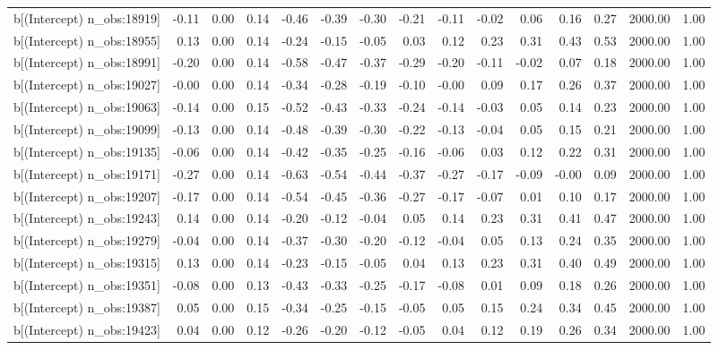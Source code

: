 \begin{table}[ht]
\begin{tabular}{rrrrrrrrrrrrrrr}
  b[(Intercept) n\_obs:18919] & -0.11 & 0.00 & 0.14 & -0.46 & -0.39 & -0.30 & -0.21 & -0.11 & -0.02 & 0.06 & 0.16 & 0.27 & 2000.00 & 1.00 \\ 
  b[(Intercept) n\_obs:18955] & 0.13 & 0.00 & 0.14 & -0.24 & -0.15 & -0.05 & 0.03 & 0.12 & 0.23 & 0.31 & 0.43 & 0.53 & 2000.00 & 1.00 \\ 
  b[(Intercept) n\_obs:18991] & -0.20 & 0.00 & 0.14 & -0.58 & -0.47 & -0.37 & -0.29 & -0.20 & -0.11 & -0.02 & 0.07 & 0.18 & 2000.00 & 1.00 \\ 
  b[(Intercept) n\_obs:19027] & -0.00 & 0.00 & 0.14 & -0.34 & -0.28 & -0.19 & -0.10 & -0.00 & 0.09 & 0.17 & 0.26 & 0.37 & 2000.00 & 1.00 \\ 
  b[(Intercept) n\_obs:19063] & -0.14 & 0.00 & 0.15 & -0.52 & -0.43 & -0.33 & -0.24 & -0.14 & -0.03 & 0.05 & 0.14 & 0.23 & 2000.00 & 1.00 \\ 
  b[(Intercept) n\_obs:19099] & -0.13 & 0.00 & 0.14 & -0.48 & -0.39 & -0.30 & -0.22 & -0.13 & -0.04 & 0.05 & 0.15 & 0.21 & 2000.00 & 1.00 \\ 
  b[(Intercept) n\_obs:19135] & -0.06 & 0.00 & 0.14 & -0.42 & -0.35 & -0.25 & -0.16 & -0.06 & 0.03 & 0.12 & 0.22 & 0.31 & 2000.00 & 1.00 \\ 
  b[(Intercept) n\_obs:19171] & -0.27 & 0.00 & 0.14 & -0.63 & -0.54 & -0.44 & -0.37 & -0.27 & -0.17 & -0.09 & -0.00 & 0.09 & 2000.00 & 1.00 \\ 
  b[(Intercept) n\_obs:19207] & -0.17 & 0.00 & 0.14 & -0.54 & -0.45 & -0.36 & -0.27 & -0.17 & -0.07 & 0.01 & 0.10 & 0.17 & 2000.00 & 1.00 \\ 
  b[(Intercept) n\_obs:19243] & 0.14 & 0.00 & 0.14 & -0.20 & -0.12 & -0.04 & 0.05 & 0.14 & 0.23 & 0.31 & 0.41 & 0.47 & 2000.00 & 1.00 \\ 
  b[(Intercept) n\_obs:19279] & -0.04 & 0.00 & 0.14 & -0.37 & -0.30 & -0.20 & -0.12 & -0.04 & 0.05 & 0.13 & 0.24 & 0.35 & 2000.00 & 1.00 \\ 
  b[(Intercept) n\_obs:19315] & 0.13 & 0.00 & 0.14 & -0.23 & -0.15 & -0.05 & 0.04 & 0.13 & 0.23 & 0.31 & 0.40 & 0.49 & 2000.00 & 1.00 \\ 
  b[(Intercept) n\_obs:19351] & -0.08 & 0.00 & 0.13 & -0.43 & -0.33 & -0.25 & -0.17 & -0.08 & 0.01 & 0.09 & 0.18 & 0.26 & 2000.00 & 1.00 \\ 
  b[(Intercept) n\_obs:19387] & 0.05 & 0.00 & 0.15 & -0.34 & -0.25 & -0.15 & -0.05 & 0.05 & 0.15 & 0.24 & 0.34 & 0.45 & 2000.00 & 1.00 \\ 
  b[(Intercept) n\_obs:19423] & 0.04 & 0.00 & 0.12 & -0.26 & -0.20 & -0.12 & -0.05 & 0.04 & 0.12 & 0.19 & 0.26 & 0.34 & 2000.00 & 1.00 \\ 

\end{tabular}
\end{table}
